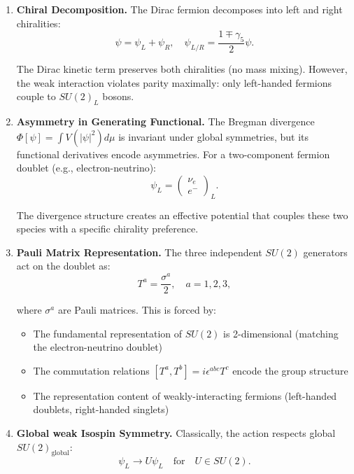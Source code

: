 \begin{enumerate}
\item \textbf{Chiral Decomposition.} The Dirac fermion decomposes into left and right chiralities:
\begin{equation}
\psi = \psi_L + \psi_R, \quad \psi_{L/R} = \frac{1 \mp \gamma_5}{2}\psi.
\end{equation}

The Dirac kinetic term preserves both chiralities (no mass mixing). However, the weak interaction violates parity maximally: only left-handed fermions couple to $SU(2)_L$ bosons.

\item \textbf{Asymmetry in Generating Functional.} The Bregman divergence $\Phi[\psi] = \int V(|\psi|^2) d\mu$ is invariant under global symmetries, but its functional derivatives encode asymmetries. For a two-component fermion doublet (e.g., electron-neutrino):
\begin{equation}
\psi_L = \begin{pmatrix} \nu_e \\ e^- \end{pmatrix}_L.
\end{equation}

The divergence structure creates an effective potential that couples these two species with a specific chirality preference.

\item \textbf{Pauli Matrix Representation.} The three independent $SU(2)$ generators act on the doublet as:
\begin{equation}
T^a = \frac{\sigma^a}{2}, \quad a = 1, 2, 3,
\end{equation}

where $\sigma^a$ are Pauli matrices. This is forced by:
\begin{itemize}
\item The fundamental representation of $SU(2)$ is 2-dimensional (matching the electron-neutrino doublet)
\item The commutation relations $[T^a, T^b] = i\epsilon^{abc}T^c$ encode the group structure
\item The representation content of weakly-interacting fermions (left-handed doublets, right-handed singlets)
\end{itemize}

\item \textbf{Global weak Isospin Symmetry.} Classically, the action respects global $SU(2)_{\text{global}}$:
\begin{equation}
\psi_L \to U \psi_L \quad \text{for} \quad U \in SU(2).
\end{equation}


\end{enumerate}
